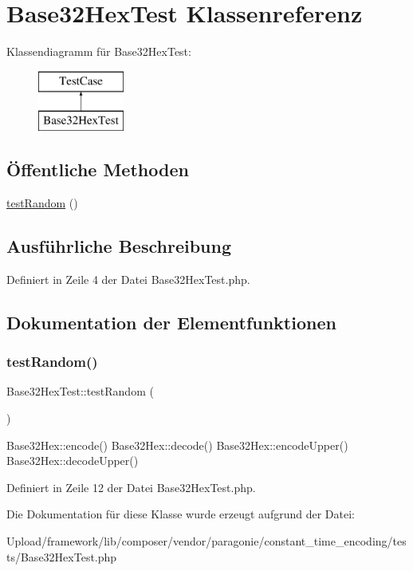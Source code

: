 \hypertarget{class_base32_hex_test}{}\section{Base32\+Hex\+Test Klassenreferenz}
\label{class_base32_hex_test}
Klassendiagramm für Base32\+Hex\+Test\+:\begin{figure}[H]
\begin{center}
\leavevmode
\includegraphics[height=2.000000cm]{class_base32_hex_test}
\end{center}
\end{figure}
\subsection*{Öffentliche Methoden}
\begin{DoxyCompactItemize}
\item 
\mbox{\hyperlink{class_base32_hex_test_a5942b3273729fd57e699dca51819d88e}{test\+Random}} ()
\end{DoxyCompactItemize}


\subsection{Ausführliche Beschreibung}


Definiert in Zeile 4 der Datei Base32\+Hex\+Test.\+php.



\subsection{Dokumentation der Elementfunktionen}
\mbox{\label{class_base32_hex_test_a5942b3273729fd57e699dca51819d88e}} 
\subsubsection{\texorpdfstring{test\+Random()}{testRandom()}}
{\footnotesize\ttfamily Base32\+Hex\+Test\+::test\+Random (\begin{DoxyParamCaption}{ }\end{DoxyParamCaption})}

Base32\+Hex\+::encode()  Base32\+Hex\+::decode()  Base32\+Hex\+::encode\+Upper()  Base32\+Hex\+::decode\+Upper() 

Definiert in Zeile 12 der Datei Base32\+Hex\+Test.\+php.



Die Dokumentation für diese Klasse wurde erzeugt aufgrund der Datei\+:\begin{DoxyCompactItemize}
\item 
Upload/framework/lib/composer/vendor/paragonie/constant\+\_\+time\+\_\+encoding/tests/Base32\+Hex\+Test.\+php\end{DoxyCompactItemize}

